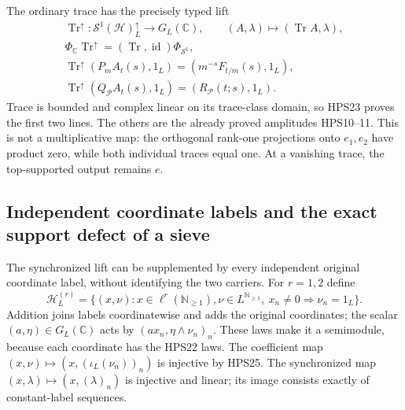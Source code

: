 The ordinary trace has the precisely typed lift
\begin{equation}\tag{HPS26}
\begin{gathered}
 \operatorname{Tr}^\uparrow:
       \mathcal S^1(\mathcal H)_L^\uparrow
             \longrightarrow G_L(\mathbb C),\qquad
 (A,\lambda)\longmapsto(\operatorname{Tr}A,\lambda),\\
 \Phi_{\mathbb C}\operatorname{Tr}^\uparrow
   =(\operatorname{Tr},\operatorname{id})
                    \Phi_{\mathcal S^1},\\
 \operatorname{Tr}^\uparrow(P_mA_t(s),1_L)
       =(m^{-s}F_{t/m}(s),1_L),\\
 \operatorname{Tr}^\uparrow(Q_{\mathcal P}A_t(s),1_L)
       =(R_{\mathcal P}(t;s),1_L).
\end{gathered}
\end{equation}
Trace is bounded and complex linear on its
trace-class domain, so HPS23 proves the
first two lines. The others are the
already proved amplitudes HPS10--11.
This is not a multiplicative map:
the orthogonal rank-one projections onto
$e_1,e_2$ have product zero, while both
individual traces equal one. At a vanishing
trace, the top-supported output remains $e$.

\subsection{Independent coordinate labels and the exact support defect of a sieve}

The synchronized lift can be supplemented by
every independent original coordinate label,
without identifying the two carriers. For
$r=1,2$ define
\begin{equation}\tag{HPS27}
 \mathcal H_{L}^{(r)}
   =\{(x,\nu):x\in\ell^r(\mathbb N_{\ge1}),
       \nu\in L^{\mathbb N_{\ge1}},\
       x_n\ne0\Rightarrow\nu_n=1_L\}.
\end{equation}
Addition joins labels coordinatewise and
adds the original coordinates; the scalar
$(a,\eta)\in G_L(\mathbb C)$ acts by
$(ax_n,\eta\wedge\nu_n)_n$. These laws make
it a semimodule, because each coordinate
has the HPS22 laws. The coefficient map
$(x,\nu)\mapsto(x,(\iota_L(\nu_n))_n)$
is injective by HPS25. The synchronized
map $(x,\lambda)\mapsto(x,(\lambda)_n)$
is injective and linear; its image consists
exactly of constant-label sequences.

